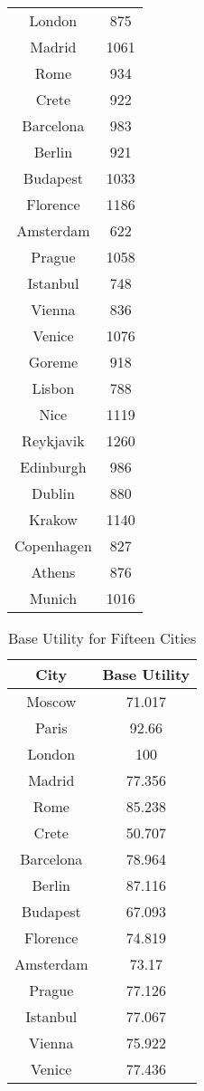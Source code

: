 \documentclass[12pt]{article}
\begin{document}
\begin{table}[ht]
\begin{minipage}[b]{0.45\linewidth}
\begin{tabular}{c|c}
			London & 875 \\
			Madrid & 1061 \\
			Rome & 934 \\
			Crete & 922 \\
			Barcelona & 983 \\
			Berlin & 921 \\
			Budapest & 1033 \\
			Florence & 1186 \\
			Amsterdam & 622 \\
			Prague & 1058 \\
			Istanbul & 748 \\
			Vienna & 836 \\
			Venice & 1076 \\
			Goreme & 918 \\
			Lisbon & 788 \\
			Nice & 1119 \\
			Reykjavik & 1260 \\
			Edinburgh & 986 \\
			Dublin & 880 \\
			Krakow & 1140 \\
			Copenhagen & 827 \\
			Athens & 876 \\
			Munich & 1016 \\
		\end{tabular}
	\end{minipage}
\end{table}

\begin{table}[h]
	\caption{Base Utility for Fifteen Cities}
	\centering
	\vspace{1mm}
	\begin{tabular}{c|c}
		\hline
		\rule{0pt}{2ex} City & Base Utility  \\
		\hline
		\rule{0pt}{2ex}Moscow & 71.017 \\
		Paris & 92.66 \\
		London & 100 \\
		Madrid & 77.356 \\
		Rome & 85.238 \\
		Crete & 50.707 \\
		Barcelona & 78.964 \\
		Berlin & 87.116 \\
		Budapest & 67.093 \\
		Florence & 74.819 \\
		Amsterdam & 73.17 \\
		Prague & 77.126 \\
		Istanbul & 77.067 \\
		Vienna & 75.922 \\
		Venice & 77.436 \\
	\end{tabular}
\end{table}
\end{document}
